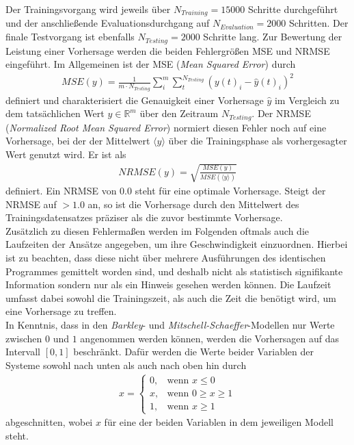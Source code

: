 Der Trainingsvorgang wird jeweils über $N_{Training}=15000$ Schritte durchgeführt und der anschließende Evaluationsdurchgang auf $N_{Evaluation} = 2000$ Schritten. Der finale Testvorgang ist ebenfalls $N_{Testing}=2000$ Schritte lang.
Zur Bewertung der Leistung einer Vorhersage werden die beiden Fehlergrößen MSE und NRMSE eingeführt. Im Allgemeinen ist der MSE (\textit{Mean Squared Error}) durch
\begin{align}
MSE(y) = \frac{1}{m \cdot N_{Testing}} \sum_i^m \sum_t^{N_{Testing}} \left(y(t)_i - \hat{y}(t)_i \right)^2
\end{align}
definiert und charakterisiert die Genauigkeit einer Vorhersage $\hat{y}$ im Vergleich zu dem tatsächlichen Wert $y \in \mathbb{R}^m$ über den Zeitraum $N_{Testing}$. Der NRMSE (\textit{Normalized Root Mean Squared Error}) normiert diesen Fehler noch auf eine Vorhersage, bei der der Mittelwert $\langle y \rangle$ über die Trainingsphase als vorhergesagter Wert genutzt wird. Er ist als
\begin{align}
NRMSE(y) = \sqrt{\frac{MSE(y)}{MSE\left(\langle y \rangle\right)}}
\end{align}
definiert. Ein NRMSE von $0.0$ steht für eine optimale Vorhersage. Steigt der NRMSE auf $>1.0$ an, so ist die Vorhersage durch den Mittelwert des Trainingsdatensatzes präziser als die zuvor bestimmte Vorhersage.\\
Zusätzlich zu diesen Fehlermaßen werden im Folgenden oftmals auch die Laufzeiten der Ansätze angegeben, um ihre Geschwindigkeit einzuordnen. Hierbei ist zu beachten, dass diese nicht über mehrere Ausführungen des identischen Programmes gemittelt worden sind, und deshalb nicht als statistisch signifikante Information sondern nur als ein Hinweis gesehen werden können. Die Laufzeit umfasst dabei sowohl die Trainingszeit, als auch die Zeit die benötigt wird, um eine Vorhersage zu treffen.\\

In Kenntnis, dass in den \textit{Barkley}- und \textit{Mitschell-Schaeffer}-Modellen nur Werte zwischen $0$ und $1$ angenommen werden können, werden die Vorhersagen auf das Intervall $[0, 1]$ beschränkt. Dafür werden die Werte beider Variablen der Systeme sowohl nach unten als auch nach oben hin durch 
\begin{align}
x = \begin{cases}
	0,& \text{wenn } x \leq 0\\
	x,& \text{wenn } 0 \geq x \geq1\\
    1,& \text{wenn } x \geq 1
\end{cases}
\end{align}
abgeschnitten, wobei $x$ für eine der beiden Variablen in dem jeweiligen Modell steht.\\

